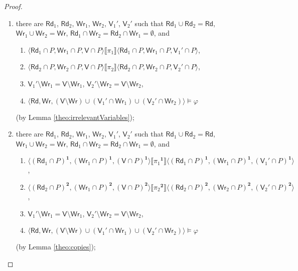 \documentclass{llncs}
\newcommand{\cp}[2]{{#2}^\mathbf{#1}}
\newcommand{\readset}{\mathsf{Rd}}
\newcommand{\valuset}{\mathsf{V}}
\newcommand{\writeset}{\mathsf{Wr}}
\newcommand{\intPgm}[1]{\llbracket #1 \rrbracket}
\renewcommand{\phi}{\varphi}
\newcommand{\tuple}[1]{ \langle #1 \rangle}
\begin{document}
\begin{proof}
\begin{enumerate}
\item
there are 
$\readset_1$, $\readset_2$, $\writeset_1$, $\writeset_2$, $\valuset_1'$, $\valuset_2'$ such that 
$\readset_1 \cup \readset_2 = \readset$, $\writeset_1 \cup \writeset_2 = \writeset$, 
$\readset_1 \cap \writeset_2 = \readset_2 \cap \writeset_1 = \emptyset$, and
 \begin{enumerate}
 \item
$\tuple{\readset_1{\cap} P,\writeset_1{\cap} P,\valuset{\cap} P} \intPgm{\pi_1} \tuple{\readset_1{\cap} P,\writeset_1{\cap} P,\valuset_1'{\cap} P}$,
 \item
$\tuple{\readset_2{\cap} P,\writeset_2{\cap} P,\valuset{\cap} P} \intPgm{\pi_2} \tuple{\readset_2{\cap} P,\writeset_2{\cap} P,\valuset_2'{\cap} P}$,
 \item
$\valuset_1' \setminus \writeset_1 = \valuset \setminus \writeset_1 $,
$\valuset_2' \setminus \writeset_2 = \valuset \setminus \writeset_2 $,
 \item
$\tuple{\readset,\writeset, 
(\valuset {\setminus} \writeset) \cup (\valuset_1' {\cap} \writeset_1) \cup (\valuset_2' {\cap} \writeset_2) } \models \phi$ 
\end{enumerate}
(by Lemma \ref{theo:irrelevantVariables});

\item
there are 
$\readset_1$, $\readset_2$, $\writeset_1$, $\writeset_2$, $\valuset_1'$, $\valuset_2'$ such that 
$\readset_1 \cup \readset_2 = \readset$, $\writeset_1 \cup \writeset_2 = \writeset$, 
$\readset_1 \cap \writeset_2 = \readset_2 \cap \writeset_1 = \emptyset$, and
 \begin{enumerate}
 \item
$\tuple{\cp 1 {(\readset_1{\cap} P)},\cp 1 {(\writeset_1{\cap} P)},\cp 1 {(\valuset{\cap} P)}} \intPgm{\cp 1 {\pi_1}} \tuple{\cp 1 {(\readset_1{\cap} P)},\cp 1 {(\writeset_1{\cap} P)},\cp 1 {(\valuset_1'{\cap} P)}}$,
 \item
$\tuple{\cp 2 {(\readset_2{\cap} P)},\cp 2 {(\writeset_1{\cap} P)},\cp 2 {(\valuset{\cap} P)}} \intPgm{\cp 2 {\pi_2}} \tuple{\cp 2 {(\readset_2{\cap} P)},\cp 2 {(\writeset_2{\cap} P)},\cp 2 {(\valuset_2'{\cap} P)}}$,
 \item
$\valuset_1' \setminus \writeset_1 = \valuset \setminus \writeset_1 $,
$\valuset_2' \setminus \writeset_2 = \valuset \setminus \writeset_2 $,
 \item
$\tuple{\readset,\writeset, 
(\valuset {\setminus} \writeset) \cup (\valuset_1' {\cap} \writeset_1) \cup (\valuset_2' {\cap} \writeset_2) } \models \phi$ 
 \end{enumerate}
(by Lemma \ref{theo:copies});


\end{enumerate}
\end{proof}
\end{document}
